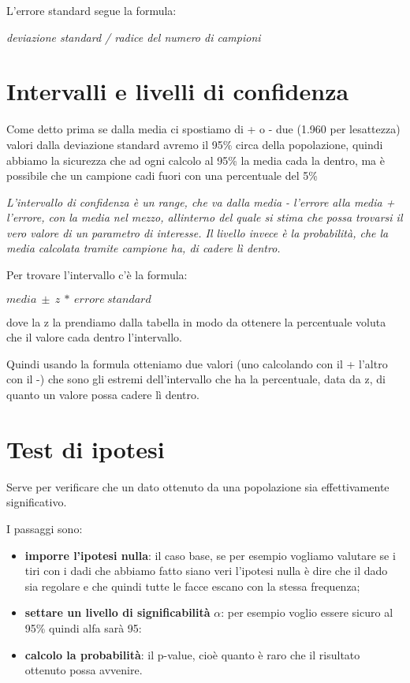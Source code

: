 L'errore standard segue la formula:

\emph{deviazione standard / radice del numero di campioni}

\section{Intervalli e livelli di
confidenza}\label{intervalli-e-livelli-di-confidenza}

Come detto prima se dalla media ci spostiamo di + o - due (1.960 per
l\textquotesingle esattezza) valori dalla deviazione standard avremo il
95\% circa della popolazione, quindi abbiamo la sicurezza che ad ogni
calcolo al 95\% la media cada la dentro, ma è possibile che un campione
cadi fuori con una percentuale del 5\%

\emph{L'intervallo di confidenza è un range, che va dalla media -
l'errore alla media + l'errore, con la media nel mezzo,
all\textquotesingle interno del quale si stima che possa trovarsi il
vero valore di un parametro di interesse. Il livello invece è la
probabilità, che la media calcolata tramite campione ha, di cadere lì
dentro.}

Per trovare l'intervallo c'è la formula:

\(media\  \pm \ z\ *\ errore\ standard\)

dove la z la prendiamo dalla tabella in modo da ottenere la percentuale
voluta che il valore cada dentro l'intervallo.

Quindi usando la formula otteniamo due valori (uno calcolando con il +
l'altro con il -) che sono gli estremi dell'intervallo che ha la
percentuale, data da z, di quanto un valore possa cadere lì dentro.

\section{Test di ipotesi}\label{test-di-ipotesi}

Serve per verificare che un dato ottenuto da una popolazione sia
effettivamente significativo.

I passaggi sono:

\begin{itemize}
\item
  \textbf{imporre l'ipotesi nulla}: il caso base, se per esempio
  vogliamo valutare se i tiri con i dadi che abbiamo fatto siano veri
  l'ipotesi nulla è dire che il dado sia regolare e che quindi tutte le
  facce escano con la stessa frequenza;
\item
  \textbf{settare un livello di significabilità} \(\alpha\): per esempio
  voglio essere sicuro al 95\% quindi alfa sarà 95:
\item
  \textbf{calcolo la probabilità}: il p-value, cioè quanto è raro che il
  risultato ottenuto possa avvenire.
\end{itemize}

